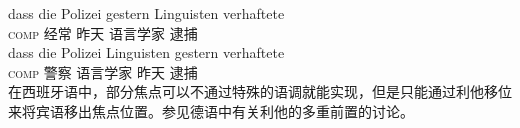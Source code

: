 
\eal
\ex 
\gll dass die Polizei gestern Linguisten verhaftete\\
	 \textsc{comp}  经常 昨天 语言学家 逮捕\\
\ex 
\gll dass die Polizei Linguisten gestern verhaftete\\
	 \textsc{comp}  警察 语言学家 昨天 逮捕\\
\zl
%
在西班牙语中，部分焦点可以不通过特殊的语调就能实现，但是只能通过利他移位来将宾语移出焦点位置。参见德语中有关利他的多重前置的讨论。

